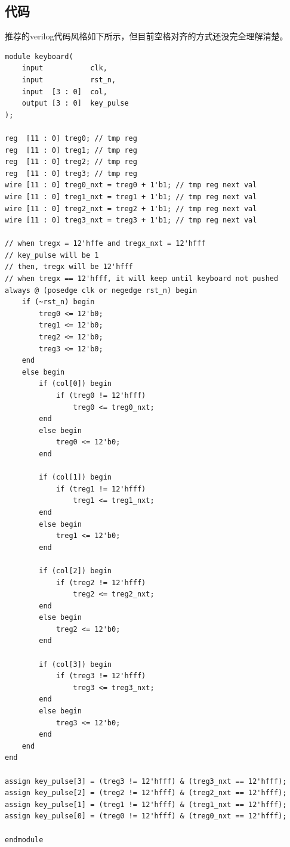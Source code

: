 \subsection{代码}
推荐的verilog代码风格如下所示，但目前空格对齐的方式还没完全理解清楚。
\lstset{language=verilog}
\begin{lstlisting}
module keyboard(
    input           clk,
    input           rst_n,
    input  [3 : 0]  col,
    output [3 : 0]  key_pulse
);

reg  [11 : 0] treg0; // tmp reg
reg  [11 : 0] treg1; // tmp reg
reg  [11 : 0] treg2; // tmp reg
reg  [11 : 0] treg3; // tmp reg
wire [11 : 0] treg0_nxt = treg0 + 1'b1; // tmp reg next val
wire [11 : 0] treg1_nxt = treg1 + 1'b1; // tmp reg next val
wire [11 : 0] treg2_nxt = treg2 + 1'b1; // tmp reg next val
wire [11 : 0] treg3_nxt = treg3 + 1'b1; // tmp reg next val

// when tregx = 12'hffe and tregx_nxt = 12'hfff
// key_pulse will be 1
// then, tregx will be 12'hfff
// when tregx == 12'hfff, it will keep until keyboard not pushed
always @ (posedge clk or negedge rst_n) begin
    if (~rst_n) begin
        treg0 <= 12'b0;
        treg1 <= 12'b0;
        treg2 <= 12'b0;
        treg3 <= 12'b0;
    end
    else begin
        if (col[0]) begin 
            if (treg0 != 12'hfff) 
                treg0 <= treg0_nxt;
        end
        else begin
            treg0 <= 12'b0;
        end

        if (col[1]) begin
            if (treg1 != 12'hfff) 
                treg1 <= treg1_nxt;
        end
        else begin   
            treg1 <= 12'b0;
        end

        if (col[2]) begin
            if (treg2 != 12'hfff)
                treg2 <= treg2_nxt;
        end
        else begin
            treg2 <= 12'b0;
        end

        if (col[3]) begin
            if (treg3 != 12'hfff) 
                treg3 <= treg3_nxt;
        end
        else begin        
            treg3 <= 12'b0;
        end
    end
end

assign key_pulse[3] = (treg3 != 12'hfff) & (treg3_nxt == 12'hfff); 
assign key_pulse[2] = (treg2 != 12'hfff) & (treg2_nxt == 12'hfff);
assign key_pulse[1] = (treg1 != 12'hfff) & (treg1_nxt == 12'hfff);
assign key_pulse[0] = (treg0 != 12'hfff) & (treg0_nxt == 12'hfff);

endmodule
\end{lstlisting}